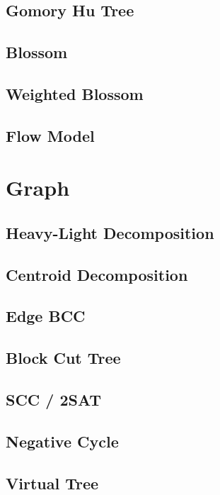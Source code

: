 \subsection{Gomory Hu Tree}

\subsection{Blossom}

\subsection{Weighted Blossom}

\subsection{Flow Model}


\section{Graph}
\subsection{Heavy-Light Decomposition}

\subsection{Centroid Decomposition}

\subsection{Edge BCC}

\subsection{Block Cut Tree}

\subsection{SCC / 2SAT}

\subsection{Negative Cycle}

\subsection{Virtual Tree}

